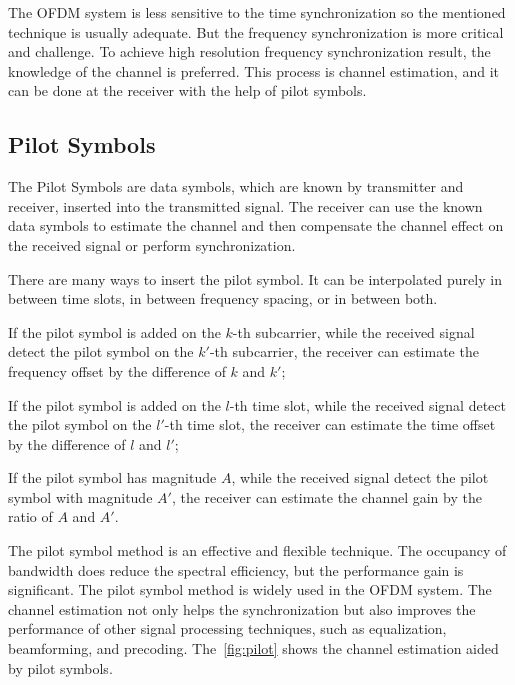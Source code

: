 The OFDM system is less sensitive to the time synchronization so the mentioned technique is usually adequate. But the frequency synchronization is more critical and challenge. To achieve high resolution frequency synchronization result, the knowledge of the channel is preferred. This process is channel estimation, and it can be done at the receiver with the help of pilot symbols.

\subsection{Pilot Symbols}
The Pilot Symbols are data symbols, which are known by transmitter and receiver, inserted into the transmitted signal. The receiver can use the known data symbols to estimate the channel and then compensate the channel effect on the received signal or perform synchronization.

There are many ways to insert the pilot symbol. It can be interpolated purely in between time slots, in between frequency spacing, or in between both.
\begin{enumerate*}[(i)]
    \item If the pilot symbol is added on the $k$-th subcarrier, while the received signal detect the pilot symbol on the $k'$-th subcarrier, the receiver can estimate the frequency offset by the difference of $k$ and $k'$;
    \item If the pilot symbol is added on the $l$-th time slot, while the received signal detect the pilot symbol on the $l'$-th time slot, the receiver can estimate the time offset by the difference of $l$ and $l'$;
    \item If the pilot symbol has magnitude $A$, while the received signal detect the pilot symbol with magnitude $A'$, the receiver can estimate the channel gain by the ratio of $A$ and $A'$.
\end{enumerate*}

The pilot symbol method is an effective and flexible technique. The occupancy of bandwidth does reduce the spectral efficiency, but the performance gain is significant. The pilot symbol method is widely used in the OFDM system. The channel estimation not only helps the synchronization but also improves the performance of other signal processing techniques, such as equalization, beamforming, and precoding.
The~\cref{fig:pilot} shows the channel estimation aided by pilot symbols.


